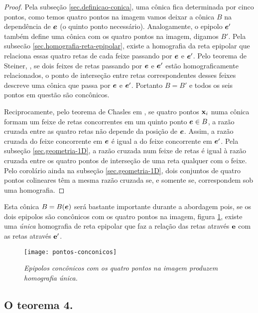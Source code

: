 \begin{proof}


Pela subseção \ref{sec.definicao-conica}, uma cônica fica determinada por cinco pontos, como temos quatro pontos na imagem vamos deixar a cônica $B$ na dependência de $\boldsymbol{e}$ (o quinto ponto necessário). Analogamente, o epipolo $\boldsymbol{e}'$ também define uma cônica com os quatro pontos na imagem, digamos $B'$. Pela subsec\~ao \ref{sec.homografia-reta-epipolar}, existe a homografia da reta epipolar que relaciona essas quatro retas de cada feixe passando por $\boldsymbol{e}$ e $\boldsymbol{e}'$. Pelo teorema de Steiner, \citep{kneebone}, se dois feixes de retas passando por $\boldsymbol{e}$ e $\boldsymbol{e}'$ estão homograficamente relacionados, o ponto de interseção entre retas correspondentes desses feixes descreve uma cônica que passa por $\boldsymbol{e}$ e $\boldsymbol{e}'$. Portanto $B=B'$ e todos os seis pontos em questão são concônicos.


Reciprocamente, pelo teorema de Chasles em \citep{kneebone}, se quatro pontos $\mathbf{x}_i$ numa cônica formam um feixe de retas concorrentes em um quinto ponto $\boldsymbol{e}\in B$, a razão cruzada entre as quatro retas não depende da posição de $\boldsymbol{e}$. Assim, a razão cruzada  do feixe concorrente em $\boldsymbol{e}$ é igual a do feixe concorrente em $\boldsymbol{e}'$. Pela subseção \ref{sec.geometria-1D}, a razão cruzada num feixe de retas é igual à razão cruzada entre os quatro pontos de interseção de uma reta qualquer com o feixe. Pelo corolário ainda na subseção \ref{sec.geometria-1D}, dois conjuntos de quatro pontos colineares têm a mesma razão cruzada se, e somente se, correspondem sob uma homografia.  
\end{proof}

Esta cônica $B=B(\boldsymbol{e})$ será bastante importante durante a abordagem pois, se os dois epipolos são concônicos com os quatro pontos na imagem, figura \ref{pontos-conconicos}, existe uma \textit{única} homografia de reta epipolar que faz a relação das retas através ${\bf e}$ com as retas através ${\bf e'}$. 

\begin{figure}[!htb]
\centering
\texttt{[image: pontos-conconicos]}
\caption{\textit{Epipolos concônicos com os quatro pontos na imagem produzem homografia única.}}
\label{pontos-conconicos}
\end{figure}

\subsection{O teorema 4.}\label{sec.demonstracao-teo-4}

